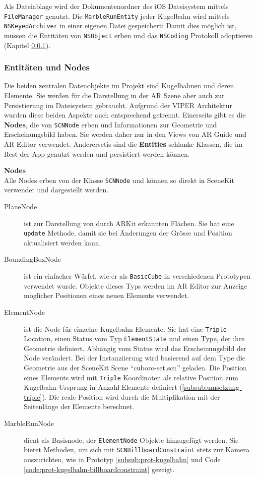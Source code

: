 Als Dateiablage wird der Dokumentenordner des iOS Dateisystem mittels \texttt{FileManager} genutzt.
Die \texttt{MarbleRunEntity} jeder Kugelbahn wird mittels \texttt{NSKeyedArchiver} in einer eigenen Datei gespeichert:
Damit dies möglich ist, müssen die Entitäten von \texttt{NSObject} erben und das \texttt{NSCoding} Protokoll adoptieren (Kapitel \ref{subsub:umsetzung-entities-nodes}).

\subsubsection{Entitäten und Nodes} \label{subsub:umsetzung-entities-nodes}

Die beiden zentralen Datenobjekte im Projekt sind Kugelbahnen und deren Elemente.
Sie werden für die Darstellung in der AR Szene aber auch zur Persistierung im Dateisystem gebraucht.
Aufgrund der VIPER Architektur wurden diese beiden Aspekte auch entsprechend getrennt.
Einerseits gibt es die \textbf{Nodes}, die von \texttt{SCNNode} erben und Informationen zur Geometrie und Erscheinungsbild haben.
Sie werden daher nur in den Views von AR Guide und AR Editor verwendet.
Anderersetis sind die \textbf{Entities} schlanke Klassen, die im Rest der App genutzt werden und persistiert werden können.

\textbf{Nodes} \\
Alle Nodes erben von der Klasse \texttt{SCNNode} und können so direkt in SceneKit verwendet und dargestellt werden.

\begin{description}
	\item[PlaneNode] ist zur Darstellung von durch ARKit erkannten Flächen. Sie hat eine \texttt{update} Methode, damit sie bei Änderungen der Grösse und Position aktualisiert werden kann.
	\item[BoundingBoxNode] ist ein einfacher Würfel, wie er als \texttt{BasicCube} in verschiedenen Prototypen verwendet wurde. Objekte dieses Typs werden im AR Editor zur Anzeige möglicher Positionen eines neuen Elements verwendet.
	\item[ElementNode] ist die Node für einzelne Kugelbahn Elemente. Sie hat eine \texttt{Triple} Location, einen Status vom Typ \texttt{ElementState} und einen Type, der ihre Geometrie definiert. Abhängig vom Status wird das Erscheinungsbild der Node verändert. Bei der Instanziierung wird basierend auf dem Type die Geometrie aus der SceneKit Scene "`cuboro-set.scn"' geladen. Die Position eines Elements wird mit \texttt{Triple} Koordinaten als relative Position zum Kugelbahn Ursprung in Anzahl Elemente definiert (\ref{subsub:umsetzung-triple}). Die reale Position wird durch die Multiplikation mit der Seitenlänge der Elemente berechnet.
	\item[MarbleRunNode] dient als Basisnode, der \texttt{ElementNode} Objekte hinzugefügt werden. Sie bietet Methoden, um sich mit \texttt{SCNBillboardConstraint} stets zur Kamera auszurichten, wie in Prototyp \ref{subsub:prot-kugelbahn} und Code \ref{code:prot-kugelbahn-billboardconstraint} gezeigt.
\end{description}

